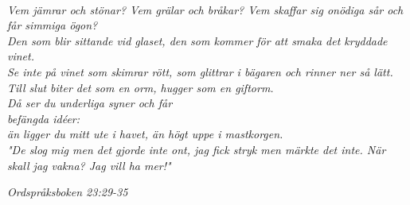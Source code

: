 \documentclass[a6paper,10pt]{article}
\begin{document}
\noindent
{}\\
\newline
\large\textit{\indent Vem jämrar och stönar? Vem grälar och bråkar? Vem skaffar sig onödiga sår och får simmiga ögon? \\
\indent Den som blir sittande vid glaset, den som kommer för att smaka det kryddade vinet. \\
\indent Se inte på vinet som skimrar rött, som glittrar i bägaren
och rinner ner så lätt.\\
\indent Till slut biter det som en orm,
hugger som en giftorm. \\
\indent Då ser du underliga syner och får \\befängda idéer:\\
\indent än ligger du mitt ute i havet, än högt uppe i mastkorgen.\\
\indent "De slog mig men det gjorde inte ont,
jag fick stryk men märkte det inte.
När skall jag vakna?
Jag vill ha mer!"}
\begin{flushright}
\textit{Ordspråksboken 23:29-35}
\end{flushright}
\end{document}
